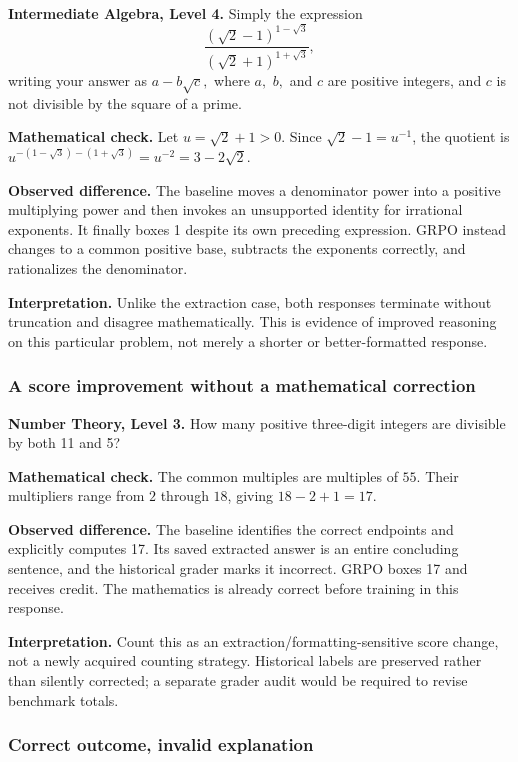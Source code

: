 \documentclass[10pt,letterpaper]{article}
\begin{document}
\textbf{Intermediate Algebra, Level 4.} Simply the expression
\[\frac{(\sqrt{2} - 1)^{1 - \sqrt{3}}}{(\sqrt{2} + 1)^{1 + \sqrt{3}}},\]writing your answer as $a - b \sqrt{c},$ where $a,$ $b,$ and $c$ are positive integers, and $c$ is not divisible by the square of a prime.

\textbf{Mathematical check.} Let $u=\sqrt{2}+1>0$. Since $\sqrt{2}-1=u^{-1}$, the quotient is $u^{-(1-\sqrt{3})-(1+\sqrt{3})}=u^{-2}=3-2\sqrt{2}$.

\textbf{Observed difference.} The baseline moves a denominator power into a positive multiplying power and then invokes an unsupported identity for irrational exponents. It finally boxes 1 despite its own preceding expression. GRPO instead changes to a common positive base, subtracts the exponents correctly, and rationalizes the denominator.

\textbf{Interpretation.} Unlike the extraction case, both responses terminate without truncation and disagree mathematically. This is evidence of improved reasoning on this particular problem, not merely a shorter or better-formatted response.

\subsubsection*{A score improvement without a mathematical correction}

\textbf{Number Theory, Level 3.} How many positive three-digit integers are divisible by both 11 and 5?

\textbf{Mathematical check.} The common multiples are multiples of $55$. Their multipliers range from $2$ through $18$, giving $18-2+1=17$.

\textbf{Observed difference.} The baseline identifies the correct endpoints and explicitly computes 17. Its saved extracted answer is an entire concluding sentence, and the historical grader marks it incorrect. GRPO boxes 17 and receives credit. The mathematics is already correct before training in this response.

\textbf{Interpretation.} Count this as an extraction/formatting-sensitive score change, not a newly acquired counting strategy. Historical labels are preserved rather than silently corrected; a separate grader audit would be required to revise benchmark totals.

\subsubsection*{Correct outcome, invalid explanation}
\end{document}
